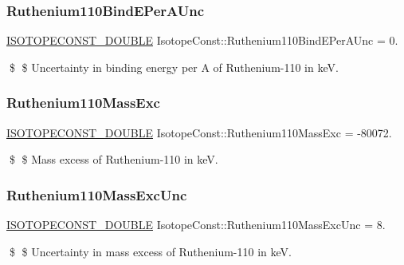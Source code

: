 \subsubsection{\texorpdfstring{Ruthenium110\+Bind\+E\+Per\+A\+Unc}{Ruthenium110BindEPerAUnc}}
{\footnotesize\ttfamily \mbox{\hyperlink{group___isotope_const-_macros_ga8f45a7272ce02c0b4c65c44636ed719a}{I\+S\+O\+T\+O\+P\+E\+C\+O\+N\+S\+T\+\_\+\+D\+O\+U\+B\+LE}} Isotope\+Const\+::\+Ruthenium110\+Bind\+E\+Per\+A\+Unc = 0.}

\$ \$ Uncertainty in binding energy per A of Ruthenium-\/110 in keV. \mbox{\label{group___isotope_const-_ruthenium-_ru110_ga9c1e215d880eb22521b5308d5f316cf9}} 
\subsubsection{\texorpdfstring{Ruthenium110\+Mass\+Exc}{Ruthenium110MassExc}}
{\footnotesize\ttfamily \mbox{\hyperlink{group___isotope_const-_macros_ga8f45a7272ce02c0b4c65c44636ed719a}{I\+S\+O\+T\+O\+P\+E\+C\+O\+N\+S\+T\+\_\+\+D\+O\+U\+B\+LE}} Isotope\+Const\+::\+Ruthenium110\+Mass\+Exc = -\/80072.}

\$ \$ Mass excess of Ruthenium-\/110 in keV. \mbox{\label{group___isotope_const-_ruthenium-_ru110_ga196a0469ed487b27888195169544338f}} 
\subsubsection{\texorpdfstring{Ruthenium110\+Mass\+Exc\+Unc}{Ruthenium110MassExcUnc}}
{\footnotesize\ttfamily \mbox{\hyperlink{group___isotope_const-_macros_ga8f45a7272ce02c0b4c65c44636ed719a}{I\+S\+O\+T\+O\+P\+E\+C\+O\+N\+S\+T\+\_\+\+D\+O\+U\+B\+LE}} Isotope\+Const\+::\+Ruthenium110\+Mass\+Exc\+Unc = 8.}

\$ \$ Uncertainty in mass excess of Ruthenium-\/110 in keV. \mbox{\label{group___isotope_const-_ruthenium-_ru110_ga5c1014e856d401f0fa4311e050f50c7e}} 
